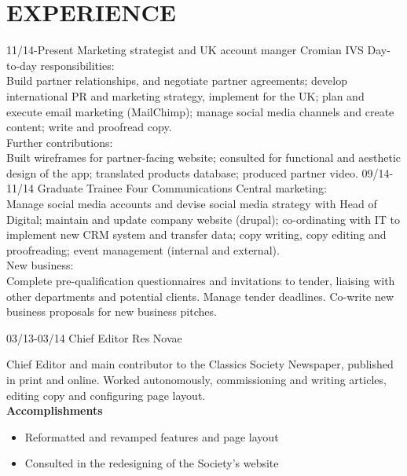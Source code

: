\documentclass[]{friggeri-cv}
\begin{document}
\section{EXPERIENCE}

\begin{entrylist}
  \entry
  {11/14-Present}
  {Marketing strategist and UK account manger}
  {Cromian IVS}
  {Day-to-day responsibilities:\\
  	Build partner relationships, and negotiate partner agreements; develop international PR and marketing strategy, implement for the UK; plan and execute email marketing (MailChimp); manage social media channels and create content; write and proofread copy. \\
  	
  	Further contributions:\\
  	Built wireframes for partner-facing website; consulted for functional and aesthetic design of the app; translated products database; produced partner video.}
  \entry
  {09/14-11/14}
  {Graduate Trainee}
  {Four Communications}
  {Central marketing:\\
  	Manage social media accounts and devise social media strategy with Head of Digital; maintain and update company website (drupal); co-ordinating with IT to implement new CRM system and transfer data; copy writing, copy editing and proofreading; event management (internal and external).\\
  	
  	New business:\\
  	Complete pre-qualification questionnaires and invitations to tender, liaising with other departments and potential clients. Manage tender deadlines. Co-write new business proposals for new business pitches.}
  
  \entry
    {03/13-03/14}
    {Chief Editor}
    {Res Novae}
    {Chief Editor and main contributor to the Classics Society Newspaper, published in print and online. Worked autonomously, commissioning and writing articles, editing copy and configuring page layout. \\
    \textbf{Accomplishments}
    \begin{itemize}
    	\item Reformatted and revamped features and page layout
    	\item Consulted in the redesigning of the Society's website
    \end{itemize}
    }   
   \end{entrylist}
\end{document}

